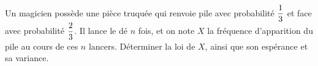 \documentclass[a4paper, 11pt,reqno]{article}
\begin{document}
\begin{exercice}  \;
	\noindent Un magicien poss\`ede une pi\`ece truqu\'ee qui renvoie pile avec probabilit\'e $\displaystyle \frac{1}{3}$ et face avec probabilit\'e $\displaystyle \frac{2}{3}$. Il lance le d\'e $n$ fois, et on note $X$ la fr\'equence d'apparition du pile au cours de ces $n$ lancers.
 D\'eterminer la loi de $X$, ainsi que son esp\'erance et sa variance.
\end{exercice}
\begin{correction}


\end{correction}
\end{document}
